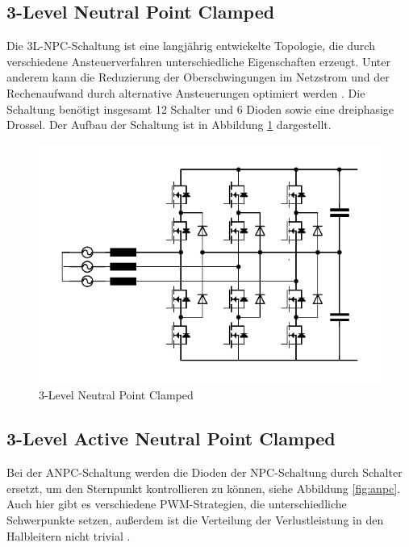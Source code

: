 	\subsection{3-Level Neutral Point Clamped}
		Die 3L-NPC-Schaltung ist eine langjährig entwickelte Topologie, die durch verschiedene Ansteuerverfahren unterschiedliche Eigenschaften erzeugt. Unter anderem kann die Reduzierung der Oberschwingungen im Netzstrom und der Rechenaufwand durch alternative Ansteuerungen optimiert werden \cite{NPC}. Die Schaltung benötigt insgesamt 12 Schalter und 6 Dioden sowie eine dreiphasige Drossel. Der Aufbau der Schaltung ist in Abbildung \ref{fig:3l-npc} dargestellt.
		\begin{figure}[H]
			\centering
			\includegraphics[width=0.9\linewidth]{content/Grafiken/3L-NPC}
			\caption{3-Level Neutral Point Clamped}
			\label{fig:3l-npc}
		\end{figure}

	\subsection{3-Level Active Neutral Point Clamped}
		Bei der ANPC-Schaltung werden die Dioden der NPC-Schaltung durch Schalter ersetzt, um den Sternpunkt kontrollieren zu können, siehe Abbildung \ref{fig:anpc}. Auch hier gibt es verschiedene \gls{PWM}-Strategien, die unterschiedliche Schwerpunkte setzen, außerdem ist die Verteilung der Verlustleistung in den Halbleitern nicht trivial \cite{ANPC}.
	
